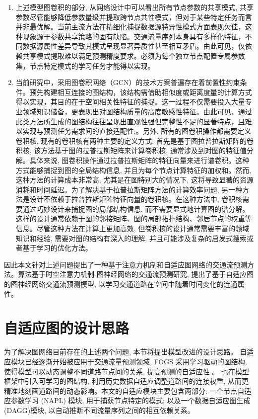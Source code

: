 \begin{enumerate}[(1)]
  \item 上述模型图卷积的部分, 从网络设计中可以看出所有节点参数的共享模式, 共享参数尽管能够降低参数量级并提取跨节点共性模式，但对于某些特定任务而言并非最优解。当前主流方法在精细化捕捉数据源特异性模式方面表现欠佳，这种现象源于参数共享策略的固有缺陷。交通流量序列本身具有多样化特征，不同数据源属性差异导致其模式呈现显著异质性甚至相互矛盾。由此可见，仅依赖共享模式提取难以满足预测精度要求。必须为每个独立节点配置专属参数集，节点特定模式的学习任务才能得以实现。

  \item 当前研究中，采用图卷积网络（GCN）的技术方案普遍存在着前置性约束条件。预先构建相互连接的图结构，该结构需借助相似度或距离度量的计算方式得以实现，其目的在于空间相关性特征的捕捉。这一过程不仅需要投入大量专业领域知识储备，更表现出对图结构质量的高度敏感性特征。由此可见，通过此类方法所生成的图结构往往呈现出直观性强但完整性不足的显著特点，且难以实现与预测任务需求间的直接适配性;\parencite{2021_Han_Dynamic_and_multi_faceted_spatio_temporal_deep_learning_for_traffic_speed_forecasting}。另外, 所有的图卷积操作都需要定义卷积核, 现有的卷积核有两种主要的定义方式: 首先是基于图拉普拉斯矩阵的卷积核, 该方法基于图的拉普拉斯矩阵来计算卷积核, 通常涉及到对图的特征值分解。具体来说, 图卷积操作通过拉普拉斯矩阵的特征向量来进行谱卷积。这种方式能够捕捉到图的全局结构信息, 并且为每个节点计算特征的加权和。然而, 这种方法的计算成本非常高, 尤其是在图特别大的情况下, 这将导致显著的资源消耗和时间延迟。为了解决基于拉普拉斯矩阵方法的计算效率问题, 另一种方法是设计不依赖于拉普拉斯矩阵特征向量的卷积核。在这种方法中, 卷积核需要通过巧妙设计来捕捉图的局部结构信息, 而不需要显式地计算图的谱分解。这样的设计通常依赖于图的邻接矩阵、图的局部拓扑结构、邻居节点的权重等信息。尽管这种方法在计算上更加高效, 但卷积核的设计通常需要丰富的领域知识和经验, 需要对图的结构有深入的理解, 并且可能涉及复杂的启发式搜索或者基于学习的优化方法。
\end{enumerate}

因此本文针对上述问题提出了一种基于注意力机制和自适应图网络的交通流预测方法。算法基于时空注意力机制-图神经网络的交通流预测研究, 提出了基于自适应图的图神经网络交通流预测模型, 以学习交通道路在空间中随着时间变化的连通属性。


\section{自适应图的设计思路}

为了解决图网络目前存在的上述两个问题, 本节将提出模型改进的设计思路。 自适应模块已经逐渐开始被应用于交通流量预测领域, FOGS 采用学习驱动的图结构, 使得模型可以动态调整不同道路节点间的关系, 提高预测的自适应性 \parencite{2022_Rao_FOGS_First_order_gradient_supervision_with_learning_based_graph_for_traffic_flow_forecasting}。\textcite{2021_Han_Dynamic_and_multi_faceted_spatio_temporal_deep_learning_for_traffic_speed_forecasting_2} 也在模型框架中引入可学习的图结构, 利用历史数据自适应调整道路间的连接权重, 从而更精准地刻画道路间的动态影响。本文的自适应模块主要包含两部分: 一个节点自适应参数学习 (NAPL) 模块, 用于捕获节点特定的模式; 以及一个数据自适应图生成(DAGG)模块, 以自动推断不同流量序列之间的相互依赖关系。

